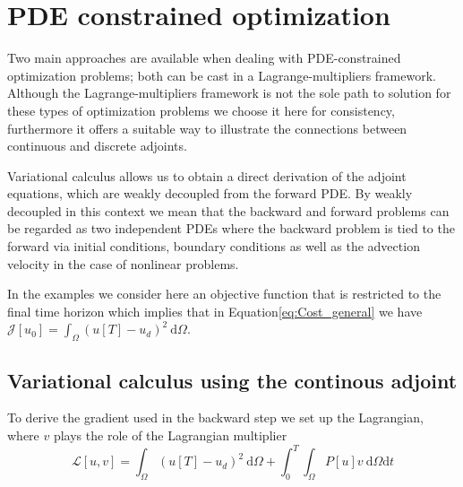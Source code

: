 \documentclass[10pt]{article}
\renewcommand{\d}{\mathrm{d}}
\begin{document}
\section{PDE constrained optimization}

Two main approaches are available when dealing with PDE-constrained optimization problems; both can be cast in a Lagrange-multipliers framework. Although the Lagrange-multipliers framework is not the sole path to solution for these types of optimization problems we choose it here for consistency, furthermore it offers a suitable way to illustrate the connections between continuous and discrete adjoints.

Variational calculus allows us to obtain a direct derivation of the adjoint equations, which are weakly decoupled from the forward PDE. By weakly decoupled in this context we mean that the backward and forward problems can be regarded as two independent PDEs where the backward problem is tied to the forward via initial conditions, boundary conditions as well as the advection velocity in the case of nonlinear problems.

In the examples we consider here an objective function that is  restricted to the final time horizon which implies that in Equation\ref{eq:Cost_general} we have $\mathcal{J}[u_0]=\int_{\Omega}( u[T]- u_d)^2 \ \d \Omega$.


\subsection{Variational calculus using the continous adjoint\label{sec:adj:continuous}} 

To derive the gradient used in the backward step we set up the Lagrangian, where $v$ plays the role of the Lagrangian multiplier
$$\mathcal{L}[ u,  v]=\int_{\Omega}( u[T]- u_d)^2 \ \d \Omega +\int_0^T\int_{\Omega} P[ u]  v \ \d \Omega \d t $$

\end{document}
